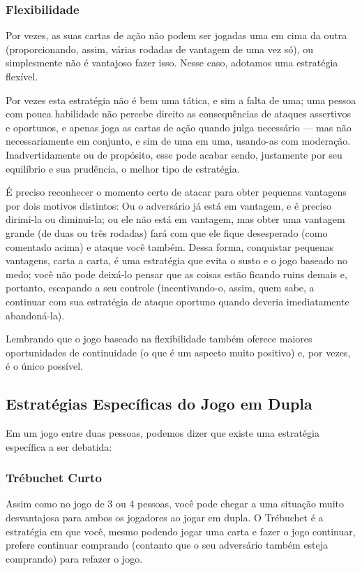 \subsubsection{Flexibilidade}

Por vezes, as suas cartas de ação não podem ser jogadas uma em cima da outra (proporcionando, assim, várias rodadas de vantagem de uma vez só), ou simplesmente não é vantajoso fazer isso. Nesse caso, adotamos uma estratégia flexível.

Por vezes esta estratégia não é bem uma tática, e sim a falta de uma; uma pessoa com pouca habilidade não percebe direito as consequências de ataques assertivos e oportunos, e apenas joga as cartas de ação quando julga necessário --- mas não necessariamente em conjunto, e sim de uma em uma, usando-as com moderação. Inadvertidamente ou de propósito, esse pode acabar sendo, justamente por seu equilíbrio e sua prudência, o melhor tipo de estratégia.

É preciso reconhecer o momento certo de atacar para obter pequenas vantagens por dois motivos distintos: Ou o adversário já está em vantagem, e é preciso dirimi-la ou diminui-la; ou ele não está em vantagem, mas obter uma vantagem grande (de duas ou três rodadas) fará com que ele fique desesperado (como comentado acima) e ataque você também. Dessa forma, conquistar pequenas vantagens, carta a carta, é uma estratégia que evita o susto e o jogo baseado no medo; você não pode deixá-lo pensar que as coisas estão ficando ruins demais e, portanto, escapando a seu controle (incentivando-o, assim, quem sabe, a continuar com sua estratégia de ataque oportuno quando deveria imediatamente abandoná-la).

Lembrando que o jogo baseado na flexibilidade também oferece maiores oportunidades de continuidade (o que é um aspecto muito positivo) e, por vezes, é o único possível.

\subsection{Estratégias Específicas do Jogo em Dupla}

Em um jogo entre duas pessoas, podemos dizer que existe uma estratégia específica a ser debatida:

\subsubsection{Trébuchet Curto}

Assim como no jogo de 3 ou 4 pessoas, você pode chegar a uma situação muito desvantajosa para ambos os jogadores ao jogar em dupla. O Trébuchet é a estratégia em que você, mesmo podendo jogar uma carta e fazer o jogo continuar, prefere continuar comprando (contanto que o seu adversário também esteja comprando) para refazer o jogo.

